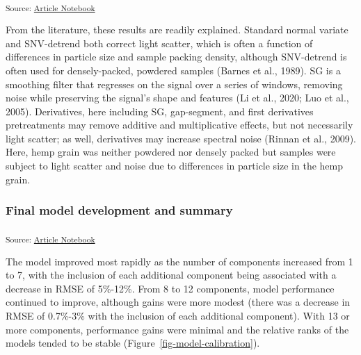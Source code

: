 \documentclass[
]{agujournal2019}
\begin{document}
\textsubscript{Source:
\href{https://rvcrawford.github.io/glowing-system/index.qmd.html}{Article
Notebook}}

From the literature, these results are readily explained. Standard
normal variate and SNV-detrend both correct light scatter, which is
often a function of differences in particle size and sample packing
density, although SNV-detrend is often used for densely-packed, powdered
samples (Barnes et al., 1989). SG is a smoothing filter that regresses
on the signal over a series of windows, removing noise while preserving
the signal's shape and features (Li et al., 2020; Luo et al., 2005).
Derivatives, here including SG, gap-segment, and first derivatives
pretreatments may remove additive and multiplicative effects, but not
necessarily light scatter; as well, derivatives may increase spectral
noise (Rinnan et al., 2009). Here, hemp grain was neither powdered nor
densely packed but samples were subject to light scatter and noise due
to differences in particle size in the hemp grain.

\subsubsection{Final model development and
summary}\label{final-model-development-and-summary}

\textsubscript{Source:
\href{https://rvcrawford.github.io/glowing-system/index.qmd.html}{Article
Notebook}}

The model improved most rapidly as the number of components increased
from 1 to 7, with the inclusion of each additional component being
associated with a decrease in RMSE of 5\%-12\%. From 8 to 12 components,
model performance continued to improve, although gains were more modest
(there was a decrease in RMSE of 0.7\%-3\% with the inclusion of each
additional component). With 13 or more components, performance gains
were minimal and the relative ranks of the models tended to be stable
(Figure~\ref{fig-model-calibration}).
\end{document}
